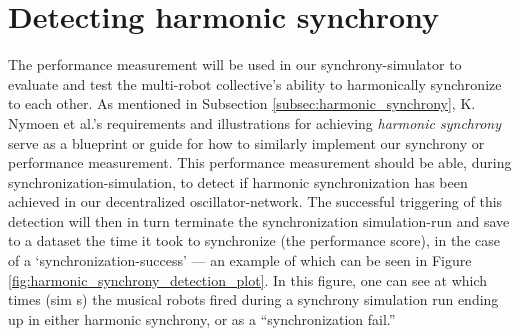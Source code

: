 	

\section{Detecting harmonic synchrony}
\label{sec:detecting_harmonic_synchrony}

	The performance measurement will be used in our synchrony-simulator to evaluate and test the multi-robot collective's ability to harmonically synchronize to each other. As mentioned in Subsection \ref{subsec:harmonic_synchrony}, K. Nymoen et al.'s requirements and illustrations \cite{nymoen_synch} for achieving \textit{harmonic synchrony} serve as a blueprint or guide for how to similarly implement our synchrony or performance measurement. This performance measurement should be able, during synchronization-simulation, to detect if harmonic synchronization has been achieved in our decentralized oscillator-network. The successful triggering of this detection will then in turn terminate the synchronization simulation-run and save to a dataset the time it took to synchronize (the performance score), in the case of a `synchronization-success' — an example of which can be seen in Figure \ref{fig:harmonic_synchrony_detection_plot}. In this figure, one can see at which times (sim s) the musical robots fired during a synchrony simulation run ending up in either harmonic synchrony, or as a ``synchronization fail.''

